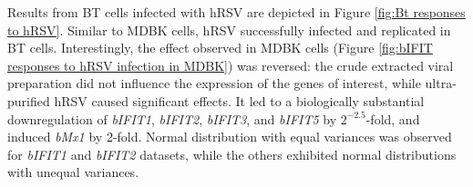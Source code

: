 Results from BT cells infected with hRSV are depicted in Figure \ref{fig:Bt responses to hRSV}. Similar to MDBK cells, hRSV successfully infected and replicated in BT cells. Interestingly, the effect observed in MDBK cells (Figure \ref{fig:bIFIT responses to hRSV infection in MDBK}) was reversed: the crude extracted viral preparation did not influence the expression of the genes of interest, while ultra-purified hRSV caused significant effects. It led to a biologically substantial downregulation of \textit{bIFIT1}, \textit{bIFIT2}, \textit{bIFIT3}, and \textit{bIFIT5} by \(2^{-2.5}\)-fold, and induced \textit{bMx1} by 2-fold. Normal distribution with equal variances was observed for \textit{bIFIT1} and \textit{bIFIT2} datasets, while the others exhibited normal distributions with unequal variances.